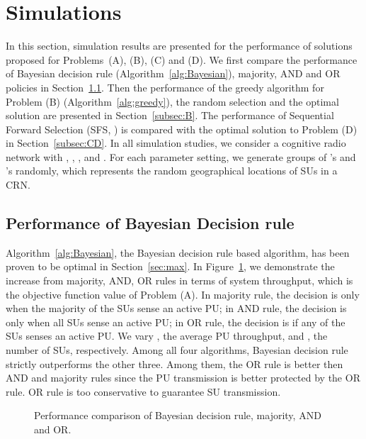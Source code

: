 \documentclass[conference]{IEEEtran}
\begin{document}
\section{Simulations}
\label{sec:simu}
In this section, simulation results are presented for the performance of solutions proposed for Problems~(A), (B), (C) and (D). We first compare the performance of Bayesian decision rule (Algorithm~\ref{alg:Bayesian}), majority, AND and OR policies \cite{4533677} in Section~\ref{subsec:A}. Then the performance of the greedy algorithm for Problem (B) (Algorithm~\ref{alg:greedy}), the random selection and the optimal solution are presented in Section~\ref{subsec:B}. The performance of Sequential Forward Selection (SFS, \cite{SFS}) is compared with the optimal solution to Problem (D) in Section~\ref{subsec:CD}. In all simulation studies, we consider a cognitive radio network with , , , and . For each parameter setting, we generate  groups of 's and 's randomly, which represents the random geographical locations of SUs in a CRN.

\subsection{Performance of Bayesian Decision rule}
\label{subsec:A}

Algorithm~\ref{alg:Bayesian}, the Bayesian decision rule based algorithm, has been proven to be optimal in Section~\ref{sec:max}. In Figure~\ref{fig:all4}, we demonstrate the increase from majority, AND, OR rules in terms of system throughput, which is the objective function value of Problem (A). In majority rule, the decision is  only when the majority of the SUs sense an active PU; in AND rule, the decision is  only when all SUs sense an active PU; in OR rule, the decision is  if any of the SUs senses an active PU. We vary , the average PU throughput, and , the number of SUs, respectively. Among all four algorithms, Bayesian decision rule strictly outperforms the other three. Among them, the OR rule is better then AND and majority rules since the PU transmission is better protected by the OR rule. OR rule is too conservative to guarantee SU transmission.  

\begin{figure}[!t]
\centering
{}
\hfil
{}
\vspace{-0.5em}
\caption{Performance comparison of Bayesian decision rule, majority, AND and OR.}
\vspace{-1.5em}
\label{fig:all4}
\end{figure}
\end{document}

